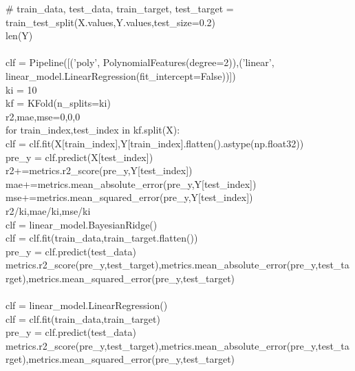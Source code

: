 \documentclass{xcumcmart}
\begin{document}
\# train\_data, test\_data, train\_target, test\_target = train\_test\_split(X.values,Y.values,test\_size=0.2)  \\
len(Y)  \\
\\
clf = Pipeline([('poly', PolynomialFeatures(degree=2)),('linear', linear\_model.LinearRegression(fit\_intercept=False))])  \\
ki = 10  \\
kf = KFold(n\_splits=ki)  \\
r2,mae,mse=0,0,0  \\
for train\_index,test\_index in kf.split(X):  \\
    clf = clf.fit(X[train\_index],Y[train\_index].flatten().astype(np.float32))  \\
    pre\_y = clf.predict(X[test\_index])  \\
    r2+=metrics.r2\_score(pre\_y,Y[test\_index])  \\
    mae+=metrics.mean\_absolute\_error(pre\_y,Y[test\_index])  \\
    mse+=metrics.mean\_squared\_error(pre\_y,Y[test\_index])  \\
r2/ki,mae/ki,mse/ki  \\
clf = linear\_model.BayesianRidge()  \\
clf = clf.fit(train\_data,train\_target.flatten())  \\
pre\_y = clf.predict(test\_data)  \\
metrics.r2\_score(pre\_y,test\_target),metrics.mean\_absolute\_error(pre\_y,test\_target),metrics.mean\_squared\_error(pre\_y,test\_target)  \\
\\
clf = linear\_model.LinearRegression()  \\
clf = clf.fit(train\_data,train\_target)  \\
pre\_y = clf.predict(test\_data)  \\
metrics.r2\_score(pre\_y,test\_target),metrics.mean\_absolute\_error(pre\_y,test\_target),metrics.mean\_squared\_error(pre\_y,test\_target)  \\
\\
\end{document}
